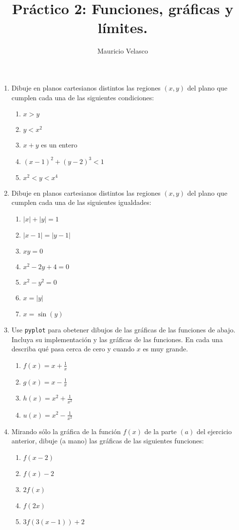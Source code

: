\documentclass[12pt, a4paper]{article}
\date{}
\begin{document}
\title{Pr\'actico 2: Funciones, gráficas y límites.}
\author{Mauricio Velasco}
\maketitle{}
\begin{enumerate} 
\item Dibuje en planos cartesianos distintos las regiones $(x,y)$ del plano que cumplen cada una de las siguientes condiciones:
\begin{enumerate}
\item $x>y$
\item $y<x^2$
\item $x+y$ es un entero
\item $(x-1)^2+(y-2)^3<1$
\item $x^2<y<x^4$
\end{enumerate}

\item Dibuje en planos cartesianos distintos las regiones $(x,y)$ del plano que cumplen cada una de las siguientes igualdades:

\begin{enumerate}
\item $|x|+|y|=1$
\item $|x-1|=|y-1|$
\item $xy=0$
\item $x^2-2y+4=0$
\item $x^2-y^2=0$
\item $x=|y|$
\item $x=\sin(y)$
\end{enumerate}

\item Use \verb!pyplot! para obetener dibujos de las gráficas de las funciones de abajo. Incluya su implementación y las gráficas de las funciones.  En cada una describa qué pasa cerca de cero y cuando $x$ es muy grande. 
\begin{enumerate}
\item $f(x)=x+\frac{1}{x}$
\item $g(x)=x-\frac{1}{x}$
\item $h(x)=x^2+\frac{1}{x^2}$
\item $u(x)=x^2-\frac{1}{x^2}$
\end{enumerate}

\item Mirando sólo la gráfica de la función $f(x)$ de la parte $(a)$  del ejercicio anterior, dibuje (a mano) las gráficas de las siguientes funciones:
\begin{enumerate}
\item $f(x-2)$
\item $f(x)-2$
\item $2f(x)$
\item $f(2x)$
\item $3f(3(x-1))+2$
\end{enumerate}





\end{enumerate}
\end{document}
